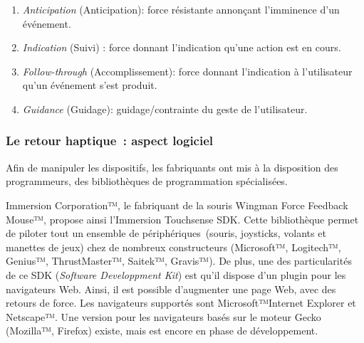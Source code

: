 \documentclass[
]{book}
\providecommand{\tightlist}{%
  \setlength{\itemsep}{0pt}\setlength{\parskip}{0pt}}
\begin{document}
\begin{enumerate}
\def\labelenumi{\arabic{enumi}.}
\tightlist
\item
  \emph{Anticipation} (Anticipation): force
  résistante annonçant l'imminence d'un événement.
\item
  \emph{Indication} (Suivi) : force donnant
  l'indication qu'une action est en cours.
\item
  \emph{Follow-through} (Accomplissement): force
  donnant l'indication à l'utilisateur qu'un événement s'est produit.
\item
  \emph{Guidance} (Guidage): guidage/contrainte du
  geste de l'utilisateur.
\end{enumerate}

\hypertarget{le-retour-haptique-aspect-logiciel}{%
\subsubsection{Le retour haptique~: aspect logiciel}\label{le-retour-haptique-aspect-logiciel}}

Afin de manipuler les dispositifs, les fabriquants ont mis à la
disposition des programmeurs, des bibliothèques de programmation
spécialisées.

Immersion Corporation™, le fabriquant de la souris Wingman Force Feedback
Mouse™, propose ainsi l'Immersion Touchsense SDK. Cette bibliothèque permet
de piloter tout un ensemble de périphériques~(souris, joysticks, volants
et manettes de jeux) chez de nombreux constructeurs (Microsoft™, Logitech™,
Genius™, ThrustMaster™, Saitek™, Gravis™). De plus, une des particularités de
ce SDK (\emph{Software Developpment Kit}) est qu'il dispose d'un plugin
pour les navigateurs Web. Ainsi, il est possible d'augmenter une page Web,
avec des retours de force. Les navigateurs supportés sont Microsoft™Internet
Explorer et Netscape™. Une version pour les navigateurs basés sur le moteur
Gecko (Mozilla™, Firefox) existe, mais est encore en phase de
développement.
\end{document}

